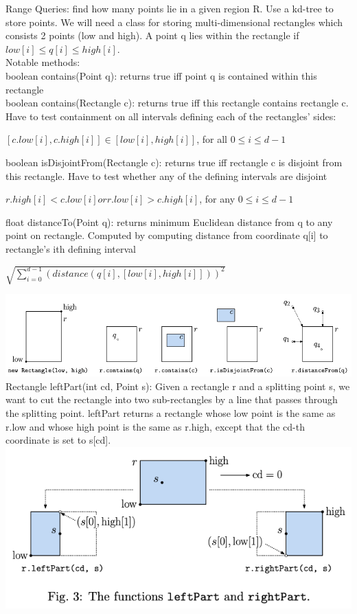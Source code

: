 \documentclass{article}
\begin{document}
  Range Queries: find how many points lie in a given region R. Use a kd-tree to store points. We will need a class for storing multi-dimensional rectangles which consists 2 points (low and high). A point q lies within the rectangle if $low[i] \leq q[i] \leq high[i]$.\\
  Notable methods:\\ 
  boolean contains(Point q): returns true iff point q is contained within this rectangle\\
  boolean contains(Rectangle c): returns true iff this rectangle contains rectangle c. Have to test containment on all intervals defining each of the rectangles' sides:
  \begin{center}
    $[c.low[i],c.high[i]] \in [low[i], high[i]]$, for all $0 \leq i \leq d - 1$
  \end{center}
  boolean isDisjointFrom(Rectangle c): returns true iff rectangle c is disjoint from this rectangle. Have to test whether any of the defining intervals are disjoint
  \begin{center}
    $r.high[i] < c.low[i] or r.low[i] > c.high[i]$, for any $0 \leq i \leq d-1$
  \end{center}
  float distanceTo(Point q): returns minimum Euclidean distance from q to any point on rectangle. Computed by computing distance from coordinate q[i] to rectangle's ith defining interval
  \begin{center}
    $\sqrt{\sum_{i=0}^{d-1}(distance(q[i], [low[i], high[i]]))^{2}}$
  \end{center}
  \includegraphics[width=\textwidth]{RangeQueriesMethods}
  \newpage
  Rectangle leftPart(int cd, Point s): Given a rectangle r and a splitting point s, we want to cut the rectangle into two sub-rectangles by a line that passes through the splitting point. leftPart returns a rectangle whose low point is the same as r.low and whose high point is the same as r.high, except that the cd-th coordinate is set to s[cd].
  \includegraphics[width=\textwidth]{RangeQueriesLeftPart}
\end{document}
